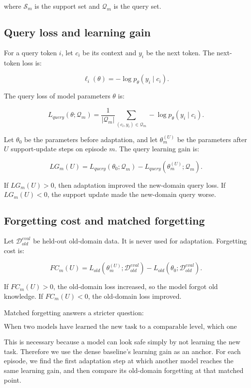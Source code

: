 \documentclass[11pt]{article}
\begin{document}
where $\mathcal{S}_m$ is the support set and $\mathcal{Q}_m$ is the query set.

\subsection{Query loss and learning gain}

For a query token $i$, let $c_i$ be its context and $y_i$ be the next token. The next-token loss is:

$$
\ell_i(\theta)=-\log p_\theta(y_i\mid c_i).
$$

The query loss of model parameters $\theta$ is:

$$
L_{query}(\theta;\mathcal{Q}_m)
=
\frac{1}{|\mathcal{Q}_m|}
\sum_{(c_i,y_i)\in\mathcal{Q}_m}
-
\log p_\theta(y_i\mid c_i).
$$

Let $\theta_0$ be the parameters before adaptation, and let $\theta_m^{(U)}$ be the parameters after $U$ support-update steps on episode $m$. The query learning gain is:

$$
LG_m(U)
=
L_{query}(\theta_0;\mathcal{Q}_m)
-
L_{query}(\theta_m^{(U)};\mathcal{Q}_m).
$$

If $LG_m(U)>0$, then adaptation improved the new-domain query loss. If $LG_m(U)<0$, the support update made the new-domain query worse.

\subsection{Forgetting cost and matched forgetting}

Let $\mathcal{D}_{old}^{eval}$ be held-out old-domain data. It is never used for adaptation. Forgetting cost is:

$$
FC_m(U)
=
L_{old}(\theta_m^{(U)};\mathcal{D}_{old}^{eval})
-
L_{old}(\theta_0;\mathcal{D}_{old}^{eval}).
$$

If $FC_m(U)>0$, the old-domain loss increased, so the model forgot old knowledge. If $FC_m(U)<0$, the old-domain loss improved.

Matched forgetting answers a stricter question:

$$
\text{When two models have learned the new task to a comparable level, which one forgets less?}
$$

This is necessary because a model can look safe simply by not learning the new task. Therefore we use the dense baseline's learning gain as an anchor. For each episode, we find the first adaptation step at which another model reaches the same learning gain, and then compare its old-domain forgetting at that matched point.
\end{document}
